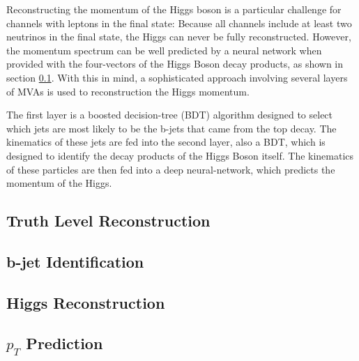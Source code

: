Reconstructing the momentum of the Higgs boson is a particular challenge for channels with leptons in the final state: Because all channels include at least two neutrinos in the final state, the Higgs can never be fully reconstructed. However, the momentum spectrum can be well predicted by a neural network when provided with the four-vectors of the Higgs Boson decay products, as shown in section \ref{sec:truthLevelReco}. With this in mind, a sophisticated approach involving several layers of MVAs is used to reconstruction the Higgs momentum. 

The first layer is a boosted decision-tree (BDT) algorithm designed to select which jets are most likely to be the b-jets that came from the top decay. The kinematics of these jets are fed into the second layer, also a BDT, which is designed to identify the decay products of the Higgs Boson itself. The kinematics of these particles are then fed into a deep neural-network, which predicts the momentum of the Higgs.

\subsection{Truth Level Reconstruction}
\label{sec:truthLevelReco}

\subsection{b-jet Identification}
\label{sec:bjetID}

\subsection{Higgs Reconstruction}
\label{sec:higgsID}

\subsection{$p_T$ Prediction}
\label{sec:ptReco}
